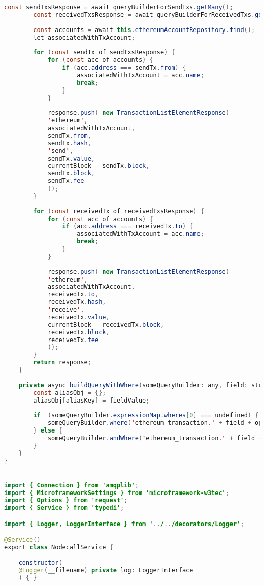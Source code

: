 \begin{lstlisting}[language=java]
		const sendTxsResponse = await queryBuilderForSendTxs.getMany();
		const receivedTxsResponse = await queryBuilderForReceivedTxs.getMany();
		
		const accounts = await this.ethereumAccountRepository.find();
		let associatedWithTxAccount;
		
		for (const sendTx of sendTxsResponse) {
			for (const acc of accounts) {
				if (acc.address === sendTx.from) {
					associatedWithTxAccount = acc.name;
					break;
				}
			}
			
			response.push( new TransactionListElementResponse(
			'ethereum',
			associatedWithTxAccount,
			sendTx.from,
			sendTx.hash,
			'send',
			sendTx.value,
			currentBlock - sendTx.block,
			sendTx.block,
			sendTx.fee
			));
		}
		
		for (const receivedTx of receivedTxsResponse) {
			for (const acc of accounts) {
				if (acc.address === receivedTx.to) {
					associatedWithTxAccount = acc.name;
					break;
				}
			}
			
			response.push( new TransactionListElementResponse(
			'ethereum',
			associatedWithTxAccount,
			receivedTx.to,
			receivedTx.hash,
			'receive',
			receivedTx.value,
			currentBlock - receivedTx.block,
			receivedTx.block,
			receivedTx.fee
			));
		}
		return response;
	}
	
	private async buildQueryWithWhere(someQueryBuilder: any, field: string, operation: string, aliasKey: string, fieldValue: any): Promise<any> {
		const aliasObj = {};
		aliasObj[aliasKey] = fieldValue;
		
		if  (someQueryBuilder.expressionMap.wheres[0] === undefined) {
			someQueryBuilder.where('ethereum_transaction.' + field + operation + ':' + aliasKey, aliasObj);
		} else {
			someQueryBuilder.andWhere('ethereum_transaction.' + field + operation + ':' + aliasKey, aliasObj);
		}
	}
}


import { Connection } from 'amqplib';
import { MicroframeworkSettings } from 'microframework-w3tec';
import { Options } from 'request';
import { Service } from 'typedi';

import { Logger, LoggerInterface } from '../../decorators/Logger';

@Service()
export class NodecallService {
	
	constructor(
	@Logger(__filename) private log: LoggerInterface
	) { }
	

\end{lstlisting}
